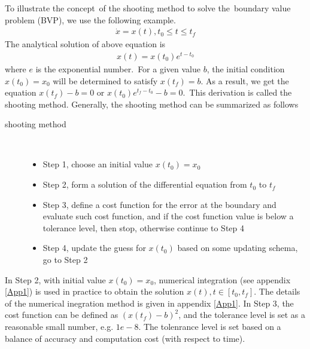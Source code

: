 \documentclass  [
  paper    = a4,
  BCOR     = 10mm,
  twoside,
  fontsize = 12pt,
  fleqn,
  toc      = bibnumbered,
  toc      = listofnumbered,
  numbers  = noendperiod,
  headings = normal,
  listof   = leveldown,
  version  = 3.03
]                                       {scrreprt}
\newcommand{\<}{\langle}
\renewcommand{\>}{\rangle}
\begin{document}
To illustrate the concept of the shooting method to solve the boundary value problem (BVP), we use the following example.
\begin{align*}
	\dot{x} = x(t), t_0 \leq t \leq t_f 
\end{align*}
The analytical solution of above equation is 
\begin{align*}
	x(t) = x(t_0)e^{t - t_0}
\end{align*}
where $e$ is the exponential number. For a given value $b$, the initial condition $x(t_0) = x_0$ will be determined to satisfy $x(t_f) = b$. As a result, we get the equation $x(t_f)-b = 0$ or $x(t_0)e^{t_f - t_0}-b = 0$. This derivation is called the shooting method. Generally, the shooting method can be summarized as follows
\begin{description}
	\item[shooting method] \
	\begin{itemize}
		\item Step 1, choose an initial value $x(t_0)=x_0$ 
		\item Step 2, form a solution of the differential equation from $t_0$ to $t_f$
		\item Step 3, define a cost function for the error at the boundary and evaluate such cost function, and if the cost function value is below a tolerance level, then stop, otherwise continue to Step 4 
		\item Step 4, update the guess for $x(t_0)$ based on some updating schema, go to Step 2
	\end{itemize}
\end{description}
In Step 2, with initial value $x(t_0)=x_0$, numerical integration (see appendix \ref{App1}) is used in practice to obtain the solution $x(t), t \in [t_0, t_f]$. The details of the numerical inegration method is given in appendix \ref{App1}. In Step 3, the cost function can be defined as $(x(t_f)-b)^2$, and the tolerance level is set as a reasonable small number, e.g. $1e-8$. The tolenrance level is set based on a balance of accuracy and computation cost (with respect to time). 
\end{document}
